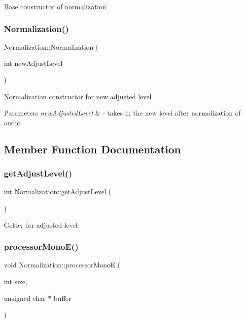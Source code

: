 Base constructor of normalization \mbox{\label{classNormalization_ac4807a0ce2a2d845bd0a8fd0f1fac662}} 
\subsubsection{\texorpdfstring{Normalization()}{Normalization()}\hspace{0.1cm}{\footnotesize\ttfamily [2/2]}}
{\footnotesize\ttfamily Normalization\+::\+Normalization (\begin{DoxyParamCaption}\item[{int}]{new\+Adjust\+Level }\end{DoxyParamCaption})}

\hyperlink{classNormalization}{Normalization} constructor for new adjusted level 
\begin{DoxyParams}{Parameters}
{\em new\+Adjusted\+Level} & -\/ takes in the new level after normalization of audio \\
\hline
\end{DoxyParams}


\subsection{Member Function Documentation}
\mbox{\label{classNormalization_a8e62b273415300146b260ec18561a448}} 
\subsubsection{\texorpdfstring{get\+Adjust\+Level()}{getAdjustLevel()}}
{\footnotesize\ttfamily int Normalization\+::get\+Adjust\+Level (\begin{DoxyParamCaption}{ }\end{DoxyParamCaption})}

Getter for adjusted level \mbox{\label{classNormalization_a61d6afdd8530c60ef098c2e404841683}} 
\subsubsection{\texorpdfstring{processor\+Mono\+E()}{processorMonoE()}}
{\footnotesize\ttfamily void Normalization\+::processor\+MonoE (\begin{DoxyParamCaption}\item[{int}]{size,  }\item[{unsigned char $\ast$}]{buffer }\end{DoxyParamCaption})\hspace{0.3cm}{\ttfamily [virtual]}}

